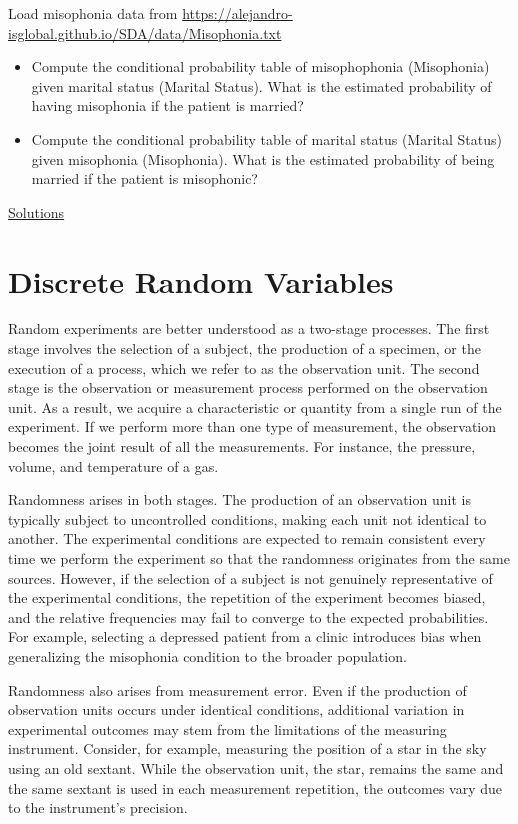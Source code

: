 \documentclass[
]{book}
\begin{document}
Load misophonia data from \url{https://alejandro-isglobal.github.io/SDA/data/Misophonia.txt}

\begin{itemize}
\item
  Compute the conditional probability table of misophophonia (Misophonia) given marital status (Marital Status). What is the estimated probability of having misophonia if the patient is married?
\item
  Compute the conditional probability table of marital status (Marital Status) given misophonia (Misophonia). What is the estimated probability of being married if the patient is misophonic?
\end{itemize}

\href{https://colab.research.google.com/drive/1ncTaoBgskCJcBIb0-PdnbUFr_AKU0XRF?usp=sharing}{Solutions}

\hypertarget{discrete-random-variables}{%
\chapter{Discrete Random Variables}\label{discrete-random-variables}}

Random experiments are better understood as a two-stage processes. The first stage involves the selection of a subject, the production of a specimen, or the execution of a process, which we refer to as the observation unit. The second stage is the observation or measurement process performed on the observation unit. As a result, we acquire a characteristic or quantity from a single run of the experiment. If we perform more than one type of measurement, the observation becomes the joint result of all the measurements. For instance, the pressure, volume, and temperature of a gas.

Randomness arises in both stages. The production of an observation unit is typically subject to uncontrolled conditions, making each unit not identical to another. The experimental conditions are expected to remain consistent every time we perform the experiment so that the randomness originates from the same sources. However, if the selection of a subject is not genuinely representative of the experimental conditions, the repetition of the experiment becomes biased, and the relative frequencies may fail to converge to the expected probabilities. For example, selecting a depressed patient from a clinic introduces bias when generalizing the misophonia condition to the broader population.

Randomness also arises from measurement error. Even if the production of observation units occurs under identical conditions, additional variation in experimental outcomes may stem from the limitations of the measuring instrument. Consider, for example, measuring the position of a star in the sky using an old sextant. While the observation unit, the star, remains the same and the same sextant is used in each measurement repetition, the outcomes vary due to the instrument's precision.
\end{document}
